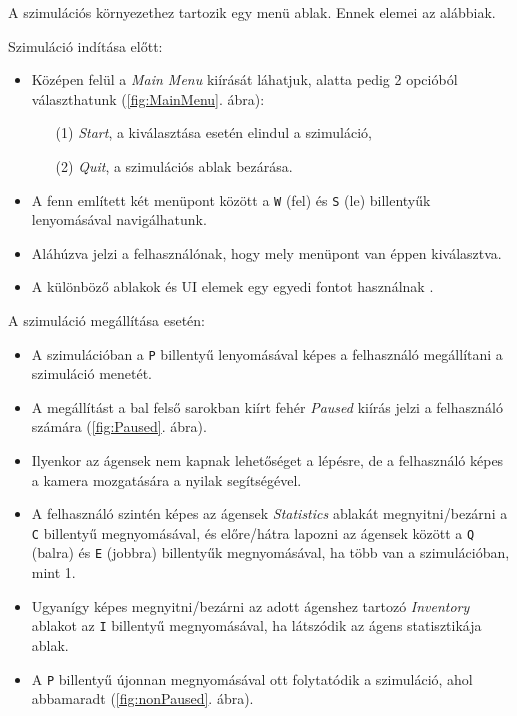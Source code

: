 
A szimulációs környezethez tartozik egy menü ablak. Ennek elemei az alábbiak.

\medskip

\noindent Szimuláció indítása előtt:
\begin{itemize}
    \item Középen felül a \textit{Main Menu} kiírását láhatjuk, alatta pedig 2 opcióból választhatunk (\ref{fig:MainMenu}. ábra):
    \begin{itemize}
    \item[(1)] \textit{Start}, a kiválasztása esetén elindul a szimuláció,
    \item[(2)] \textit{Quit}, a szimulációs ablak bezárása.
    \end{itemize}
    \item A fenn említett két menüpont között a \texttt{W} (fel) és \texttt{S} (le) billentyűk lenyomásával navigálhatunk.
    \item Aláhúzva jelzi a felhasználónak, hogy mely menüpont van éppen kiválasztva.
    \item A különböző ablakok és UI elemek egy egyedi fontot használnak \cite{yosterislandfont}.
\end{itemize}

\noindent A szimuláció megállítása esetén:

\begin{itemize}
    \item A szimulációban a \texttt{P} billentyű lenyomásával képes a felhasználó megállítani a szimuláció menetét.
    \item A megállítást a bal felső sarokban kiírt fehér \textit{Paused} kiírás jelzi a felhasználó számára (\ref{fig:Paused}. ábra).
    \item Ilyenkor az ágensek nem kapnak lehetőséget a lépésre, de a felhasználó képes a kamera mozgatására a nyilak segítségével.
    \item A felhasználó szintén képes az ágensek \textit{Statistics} ablakát megnyitni/bezárni a \texttt{C} billentyű megnyomásával, és előre/hátra lapozni az ágensek között a \texttt{Q} (balra) és \texttt{E} (jobbra) billentyűk megnyomásával, ha több van a szimulációban, mint 1.
    \item Ugyanígy képes megnyitni/bezárni az adott ágenshez tartozó \textit{Inventory} ablakot az \texttt{I} billentyű megnyomásával, ha látszódik az ágens statisztikája ablak.
    \item A \texttt{P} billentyű újonnan megnyomásával ott folytatódik a szimuláció, ahol abbamaradt (\ref{fig:nonPaused}. ábra).
\end{itemize}

